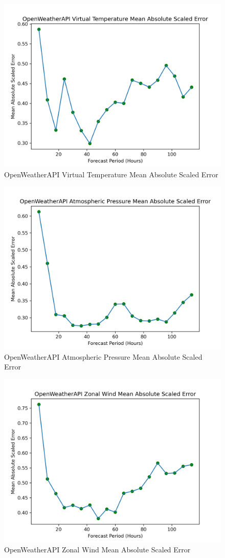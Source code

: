 \begin{appendices}
    \begin{figure}[H]
        \centering
        \includegraphics[width=.7\linewidth]{Graphs/accuracy/appendices/openweatherapi/virtual_temperature/mean_absolute_scaled_error.png}
        \caption{OpenWeatherAPI Virtual Temperature Mean Absolute Scaled Error}
    \end{figure}
    
    \begin{figure}[H]
        \centering
        \includegraphics[width=.7\linewidth]{Graphs/accuracy/appendices/openweatherapi/atmospheric_pressure/mean_absolute_scaled_error.png}
        \caption{OpenWeatherAPI Atmospheric Pressure Mean Absolute Scaled Error}
    \end{figure}
    
    \begin{figure}[H]
        \centering
        \includegraphics[width=.7\linewidth]{Graphs/accuracy/appendices/openweatherapi/zonal_wind/mean_absolute_scaled_error.png}
        \caption{OpenWeatherAPI Zonal Wind Mean Absolute Scaled Error}
    \end{figure}
    

\end{appendices}
